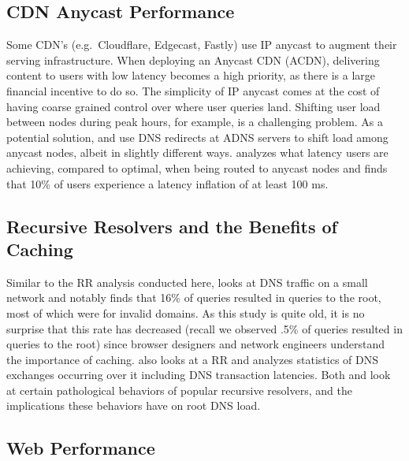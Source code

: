\documentclass[sigconf,nonacm,10pt]{acmart}
\begin{document}
\subsection{CDN Anycast Performance}\label{cdn-anycast-performance}

Some CDN's (e.g.~Cloudflare, Edgecast, Fastly) use IP anycast to augment
their serving infrastructure. When deploying an Anycast CDN (ACDN),
delivering content to users with low latency becomes a high priority, as
there is a large financial incentive to do so. The simplicity of IP
anycast comes at the cost of having coarse grained control over where
user queries land. Shifting user load between nodes during peak hours,
for example, is a challenging problem. As a potential solution,
\cite{alzoubi2011practical} and \cite{flavel2015fastroute} use DNS
redirects at ADNS servers to shift load among anycast nodes, albeit in
slightly different ways. \cite{calder2015analyzing} analyzes what
latency users are achieving, compared to optimal, when being routed to
anycast nodes and finds that 10\% of users experience a latency
inflation of at least 100 ms.

\subsection{Recursive Resolvers and the Benefits of
Caching}\label{recursive-resolvers-and-the-benefits-of-caching}

Similar to the RR analysis conducted here, \cite{jung2002dns} looks at
DNS traffic on a small network and notably finds that 16\% of queries
resulted in queries to the root, most of which were for invalid domains.
As this study is quite old, it is no surprise that this rate has
decreased (recall we observed .5\% of queries resulted in queries to the
root) since browser designers and network engineers understand the
importance of caching. \cite{callahan2013modern} also looks at a RR and
analyzes statistics of DNS exchanges occurring over it including DNS
transaction latencies. Both \cite{yu2012authority} and \cite{lentz2013d}
look at certain pathological behaviors of popular recursive resolvers,
and the implications these behaviors have on root DNS load.

\subsection{Web Performance}\label{web-performance}
\end{document}
